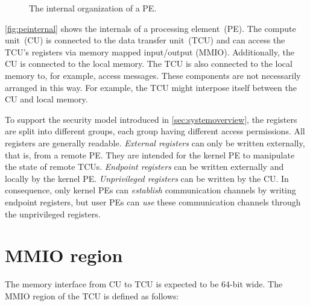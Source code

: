\documentclass[a4paper,11pt]{article}
\newcommand{\rref}[2][]{\autoref{#2}}
\begin{document}
\begin{figure}[h]
  \caption{The internal organization of a PE.}
  \label{fig:peinternal}
\end{figure}

\rref{fig:peinternal} shows the internals of a processing element~(PE). The compute unit~(CU) is
connected to the data transfer unit~(TCU) and can access the TCU's registers via memory mapped
input/output (MMIO). Additionally, the CU is connected to the local memory. The TCU is also
connected to the local memory to, for example, access messages. These components are not necessarily
arranged in this way. For example, the TCU might interpose itself between the CU and local memory.

To support the security model introduced in \rref{sec:systemoverview}, the registers are split into
different groups, each group having different access permissions. All registers are generally
readable. \emph{External registers} can only be written externally, that is, from a remote PE. They
are intended for the kernel PE to manipulate the state of remote TCUs. \emph{Endpoint registers} can
be written externally and locally by the kernel PE. \emph{Unprivileged registers} can be written by
the CU. In consequence, only kernel PEs can \emph{establish} communication channels by writing
endpoint registers, but user PEs can \emph{use} these communication channels through the
unprivileged registers.

\section{MMIO region}

The memory interface from CU to TCU is expected to be 64-bit wide. The MMIO region of the TCU is
defined as follows:
\end{document}
